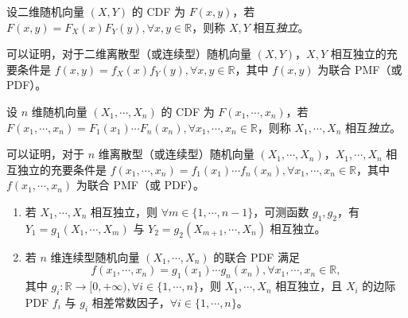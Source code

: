 \documentclass[../main.tex]{subfiles}
\begin{document}
\begin{definition}\label{def:3.6.1}
    设二维随机向量 $(X,Y)$ 的 CDF 为 $F(x,y)$，若 $F(x,y)=F_X(x)F_Y(y),\forall x,y\in\mathbb R$，则称 $X,Y$ 相互\emph{独立}。
\end{definition}

可以证明，对于二维离散型（或连续型）随机向量 $(X,Y)$，$X,Y$ 相互独立的充要条件是 $f(x,y)=f_X(x)f_Y(y),\forall x,y\in\mathbb R$，其中 $f(x,y)$ 为联合 PMF（或 PDF）。

\begin{definition}\label{def:3.6.2}
    设 $n$ 维随机向量 $(X_1,\cdots,X_n)$ 的 CDF 为 $F(x_1,\cdots,x_n)$，若 $F(x_1,\cdots,x_n)=F_{1}(x_1)\cdots F_n(x_n),\forall x_1,\cdots,x_n\in\mathbb R$，则称 $X_1,\cdots,X_n$ 相互\emph{独立}。
\end{definition}

可以证明，对于 $n$ 维离散型（或连续型）随机向量 $(X_1,\cdots,X_n)$，$X_1,\cdots,X_n$ 相互独立的充要条件是 $f(x_1,\cdots,x_n)=f_1(x_1)\cdots f_n(x_n),\forall x_1,\cdots,x_n\in\mathbb R$，其中 $f(x_1,\cdots,x_n)$ 为联合 PMF（或 PDF）。

\begin{theorem}\label{thm:3.6.1}
    \mbox{}
    \begin{enumerate}
        \item 若 $X_1,\cdots,X_n$ 相互独立，则 $\forall m\in\{1,\cdots,n-1\}$，可测函数 $g_1,g_2$，有 $Y_1=g_1(X_1,\cdots,X_m)$ 与 $Y_2=g_2(X_{m+1},\cdots,X_n)$ 相互独立。
        \item 若 $n$ 维连续型随机向量 $(X_1,\cdots,X_n)$ 的联合 PDF 满足
              \begin{equation*}
                  f(x_1,\cdots,x_n)=g_1(x_1)\cdots g_n(x_n),\forall x_1,\cdots,x_n\in\mathbb R,
              \end{equation*}
              其中 $g_i:\mathbb R\rightarrow [0,+\infty),\forall i\in\{1,\cdots,n\}$，则 $X_1,\cdots,X_n$ 相互独立，且 $X_i$ 的边际 PDF $f_i$ 与 $g_i$ 相差常数因子，$\forall i\in\{1,\cdots,n\}$。
    \end{enumerate}
\end{theorem}
\end{document}
